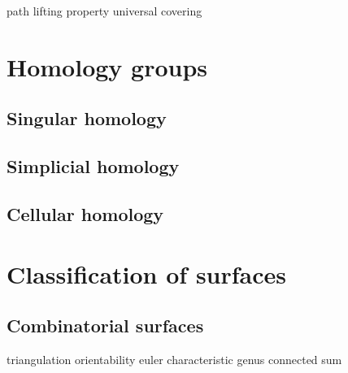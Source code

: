 \documentclass{../../large}
\begin{document}
path lifting property
universal covering

\chapter{Homology groups}
\section{Singular homology}
\section{Simplicial homology}
\section{Cellular homology}



\chapter{Classification of surfaces}
\section{Combinatorial surfaces}

triangulation
orientability
euler characteristic
genus
connected sum
\end{document}
